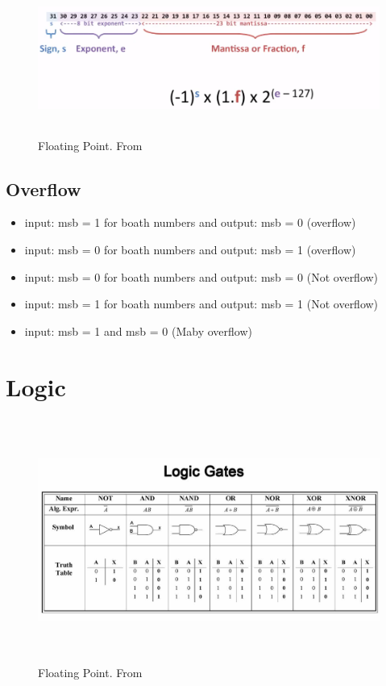 \begin{figure}[h]
    \vspace{10mm}
    \centering
    \includegraphics[width=16cm, height=5cm]{image/floating-point.png} 
    \caption{Floating Point. From \cite{}}
    \label{floating-point}
\end{figure}

\subsection{Overflow}
\begin{itemize}
\item  input: msb = 1 for boath numbers and output: msb = 0 (overflow)
\item  input: msb = 0 for boath numbers and output: msb = 1 (overflow)
\item  input: msb = 0 for boath numbers and output: msb = 0 (Not overflow)
\item  input: msb = 1 for boath numbers and output: msb = 1 (Not overflow)
\item  input: msb = 1 and msb = 0 (Maby overflow)
\end{itemize}


\newpage

\section{Logic}

\begin{figure}[h]
    \vspace{10mm}
    \centering
    \includegraphics[width=16cm, height=8cm]{image/logic-gates.jpeg} 
    \caption{Floating Point. From \cite{}}
    \label{logic-gates}
\end{figure}


